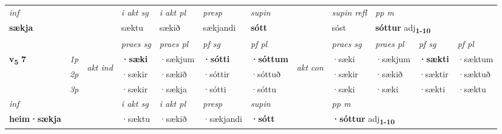 \begin{longtable}[l]{X>{\footnotesize\itshape}llXXXXlXXXX}
   {\textit{inf}} & &  & \textit{i akt sg} & \textit{i akt pl}   & \textit{presp} & \textit{supin} && \textit{supin refl} & \textit{pp m} \\*
  {\textbf{sækja}} & && sæktu  & sækið   & sækjandi &  \textbf{sótt} && sóst & \multicolumn{2}{l}{\textbf{sóttur} adj\textbf{\textsubscript{1-10}}} \\*

\midrule

 & &   & \textit{praes sg}  & \textit{praes pl}    & \textit{ pf sg} & \textit{pf pl} & & \textit{praes sg}  & \textit{praes pl}    & \textit{pf sg} & \textit{pf pl }  \\ \cmidrule{4-7} \cmidrule{9-12}
 \multirow{2}{*}{{{\textbf{v{\textsubscript{5}}} \Large{\textbf{7}}}}}  & 1p & \multirow{3}{*}{\begin{turn}{90}\textit{akt ind}\end{turn}} & \textbf{·sæki} & ·sækjum & \textbf{·sótti} & \textbf{·sóttum} & \multirow{3}{*}{\begin{turn}{90}\textit{akt con}\end{turn}} &·sæki & ·sækjum & \textbf{·sækti} & ·sæktum\\*
 & 2p &  &  ·sækir  & ·sækið & ·sóttir & ·sóttuð & & ·sækir & ·sækið & ·sæktir & ·sæktuð \\*
 & 3p &  & ·sækir & ·sækja & ·sótti & ·sóttu & & ·sæki & ·sæki& ·sækti & ·sæktu \\*
\cmidrule{4-7} \cmidrule{9-12}

   {\textit{inf}} & &  & \textit{i akt sg} & \textit{i akt pl}   & \textit{presp} & \textit{supin}  && \textit{pp m} \\*
  {\textbf{heim\allowbreak ·sækja}} & && ·sæktu  & ·sækið   & ·sækjandi &  \textbf{·sótt}  && \multicolumn{2}{l}{\textbf{·sóttur} adj\textbf{\textsubscript{1-10}}} \\*

\midrule


\end{longtable}
